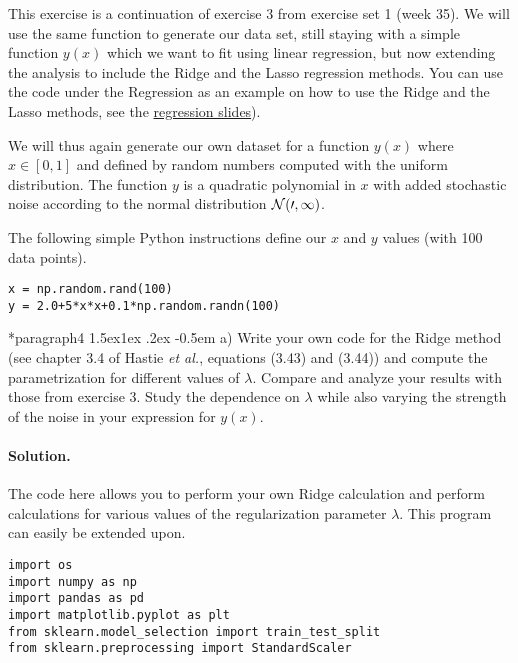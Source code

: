\documentclass[%
oneside,                 %
final,                   %
10pt]{article}
\makeatletter
\newenvironment{doconceexercise}{}{}
\newcounter{doconceexercisecounter}
\newcommand\subex{\@startsection*{paragraph}{4}{\z@}%
                  {1.5ex\@plus1ex \@minus.2ex}%
                  {-0.5em}%
                  {\normalfont\normalsize\bfseries}}
\makeatother
\begin{document}
\begin{doconceexercise}



This exercise is a continuation of exercise 3 from exercise set 1 (week 35). We will
use the same function to generate our data set, still staying with a
simple function $y(x)$ which we want to fit using linear regression,
but now extending the analysis to include the Ridge and the Lasso
regression methods. You can use the code under the Regression as an example on how to use the Ridge and the Lasso methods, see the \href{{https://compphysics.github.io/MachineLearning/doc/pub/Regression/html/Regression-bs.html}}{regression slides}). 

We will thus again generate our own dataset for a function $y(x)$ where 
$x \in [0,1]$ and defined by random numbers computed with the uniform
distribution. The function $y$ is a quadratic polynomial in $x$ with
added stochastic noise according to the normal distribution $\cal{N}(0,1)$.

The following simple Python instructions define our $x$ and $y$ values (with 100 data points).
\begin{verbatim}
x = np.random.rand(100)
y = 2.0+5*x*x+0.1*np.random.randn(100)
\end{verbatim}


\subex{a)}
Write your own code for the Ridge method (see chapter 3.4 of Hastie \emph{et al.}, equations (3.43) and (3.44)) and compute the parametrization for different values of $\lambda$. Compare and analyze your results with those from exercise 3. Study the dependence on $\lambda$ while also varying the strength of the noise in your expression for $y(x)$.


\paragraph{Solution.}
The code here allows you to perform your own Ridge calculation and perform calculations for various values of the regularization parameter $\lambda$. This program can easily be extended upon.
\begin{verbatim}
import os
import numpy as np
import pandas as pd
import matplotlib.pyplot as plt
from sklearn.model_selection import train_test_split
from sklearn.preprocessing import StandardScaler


\end{verbatim}
\end{doconceexercise}
\end{document}
